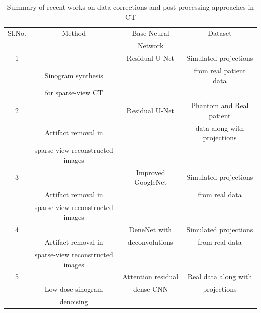 \begin{table}[ht!]
	\centering
	\caption{Summary of recent works on data corrections and post-processing approaches in \ac{CT}}
	\label{table:pp_CT}
	\scriptsize
	\begin{tabular}{||c|c|c|c||} 
		\hline
		Sl.No.    &       Method             & Base Neural          & Dataset        \\ %
            	  &                          &    Network                      &                \\
		\hline\hline
		1         & \cite{lee2018deep}       &   Residual U-Net     & Simulated projections          \\     
		          &  Sinogram synthesis      &                      & from real patient data         \\ 
		          &   for sparse-view CT     &                      &                                \\ 
		\hline
		2         &  \cite{jin2017deep}      & Residual U-Net       & Phantom and Real patient       \\
		          & Artifact removal in      &                      &   data along with projections  \\
		          & sparse-view reconstructed images&               &                                \\
		\hline  
		3         & \cite{xie2018artifact}   & Improved GoogleNet   & Simulated projections          \\ 
		          & Artifact removal in      &                      & from real data                 \\ 
		          & sparse-view reconstructed images&               &                                \\ 
		\hline
		4         & \cite{zhang2018sparse}    & DeneNet with        & Simulated projections          \\ 
		          & Artifact removal in       & deconvolutions      & from real data                 \\ 
		          & sparse-view reconstructed images&               &                                \\ 
		\hline
		5         & \cite{ma2021sinogram}     & Attention residual  & Real data along with           \\ 
		          & Low dose sinogram         &  dense CNN          & projections                    \\ 
		          & denoising                 &                     &                                \\ 

\end{tabular}
\end{table}
